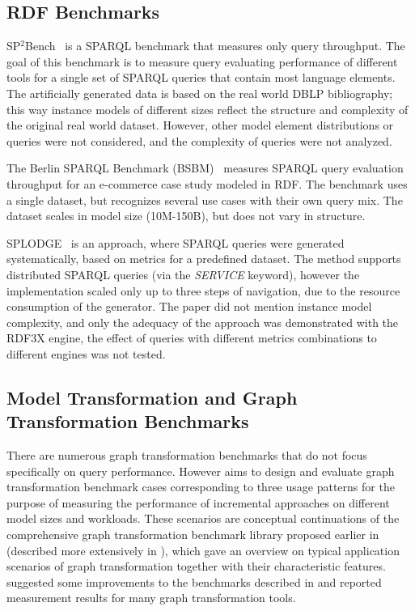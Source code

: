 \subsection{RDF Benchmarks}

SP$^{2}$Bench~\cite{SP2Bench} is a SPARQL benchmark that measures only
query throughput. The goal of this benchmark is to measure query evaluating
performance of different tools for a single set of SPARQL queries that contain most language
elements. The artificially generated data is based on the real world
DBLP bibliography; this way instance models of different sizes reflect the
structure and complexity of the original real world dataset. However, other
model element distributions or queries were not considered, and the complexity of queries
were not analyzed.

The Berlin SPARQL Benchmark (BSBM)~\cite{BSBM} measures SPARQL query evaluation throughput for an
e-commerce case study modeled in RDF. The benchmark uses a single dataset, but recognizes several use cases with their own query mix. The dataset scales in model size (10M-150B), but does not vary in structure.  

SPLODGE~\cite{SPLODGE} is an approach, where SPARQL queries were generated
systematically, based on metrics for a predefined dataset. The method supports distributed
SPARQL queries (via the \emph{SERVICE} keyword), however the implementation
scaled only up to three steps of navigation, due to the resource consumption of the
generator. The paper did not mention instance model complexity, and only the
adequacy of the approach was demonstrated with the RDF3X engine, the effect of
queries with different metrics combinations to different engines was not tested.

\subsection{Model Transformation and Graph Transformation Benchmarks}

There are numerous graph transformation benchmarks that do not focus specifically on query performance. However \cite{icgt08-bhrv} aims to design and evaluate graph transformation benchmark cases corresponding to three usage patterns for the purpose of measuring the performance of incremental approaches on different model sizes and workloads. These scenarios are conceptual continuations of the comprehensive graph transformation benchmark library proposed earlier in \cite{vlhcc05_vsv} (described more extensively in \cite{VSV05}), which gave an overview on typical application scenarios of graph transformation together with their characteristic features. \cite{GK:07} suggested some improvements to the benchmarks described in \cite{vlhcc05_vsv} and reported measurement results for many graph transformation tools. 

